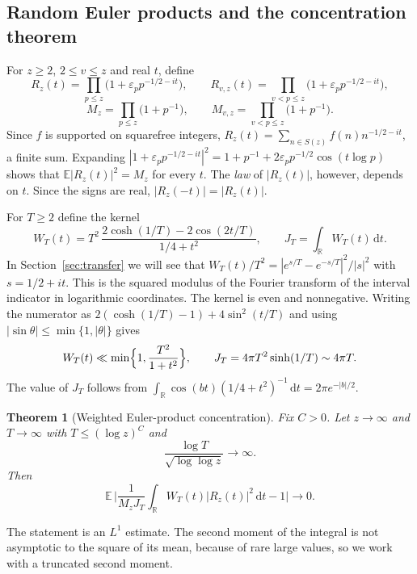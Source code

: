 \documentclass[11pt]{amsart}
\newtheorem{theorem}{Theorem}[section]
\theoremstyle{remark}
\numberwithin{equation}{section}
\newcommand{\E}{\mathbb{E}}
\newcommand{\R}{\mathbb{R}}
\newcommand{\dd}{\,\mathrm{d}}
\begin{document}
\subsection{Random Euler products and the concentration theorem}
For $z\ge2$, $2\le v\le z$ and real $t$, define
\[
R_z(t)=\prod_{p\le z}\bigl(1+\varepsilon_pp^{-1/2-it}\bigr),\qquad R_{v,z}(t)=\prod_{v<p\le z}\bigl(1+\varepsilon_pp^{-1/2-it}\bigr),
\]
\[
M_z=\prod_{p\le z}\bigl(1+p^{-1}\bigr),\qquad M_{v,z}=\prod_{v<p\le z}\bigl(1+p^{-1}\bigr).
\]
Since $f$ is supported on squarefree integers, $R_z(t)=\sum_{n\in S(z)}f(n)n^{-1/2-it}$, a finite sum. Expanding $|1+\varepsilon_pp^{-1/2-it}|^2=1+p^{-1}+2\varepsilon_pp^{-1/2}\cos(t\log p)$ shows that $\E|R_z(t)|^2=M_z$ for every $t$. The \emph{law} of $|R_z(t)|$, however, depends on $t$. Since the signs are real, $|R_z(-t)|=|R_z(t)|$.

For $T\ge2$ define the kernel
\begin{equation}\label{eq:WT}
W_T(t)=T^2\,\frac{2\cosh(1/T)-2\cos(2t/T)}{1/4+t^2},\qquad J_T=\int_\R W_T(t)\dd t .
\end{equation}
In Section~\ref{sec:transfer} we will see that $W_T(t)/T^2=|e^{s/T}-e^{-s/T}|^2/|s|^2$ with $s=1/2+it$. This is the squared modulus of the Fourier transform of the interval indicator in logarithmic coordinates. The kernel is even and nonnegative. Writing the numerator as $2(\cosh(1/T)-1)+4\sin^2(t/T)$ and using $|\sin\theta|\le\min\{1,|\theta|\}$ gives
\begin{equation}\label{eq:Wbounds}
W_T(t)\ll\min\Bigl\{1,\frac{T^2}{1+t^2}\Bigr\},\qquad J_T=4\pi T^2\sinh(1/T)\sim4\pi T .
\end{equation}
The value of $J_T$ follows from $\int_\R\cos(bt)(1/4+t^2)^{-1}\dd t=2\pi e^{-|b|/2}$.

\begin{theorem}[Weighted Euler-product concentration]\label{thm:conc}
Fix $C>0$. Let $z\to\infty$ and $T\to\infty$ with $T\le(\log z)^C$ and
\begin{equation}\label{eq:Tcond}
\frac{\log T}{\sqrt{\log\log z}}\longrightarrow\infty .
\end{equation}
Then
\begin{equation}\label{eq:conc}
\E\,\biggl|\frac{1}{M_zJ_T}\int_\R W_T(t)|R_z(t)|^2\dd t-1\biggr|\longrightarrow0 .
\end{equation}
\end{theorem}

The statement is an $L^1$ estimate. The second moment of the integral is not asymptotic to the square of its mean, because of rare large values, so we work with a truncated second moment.
\end{document}
